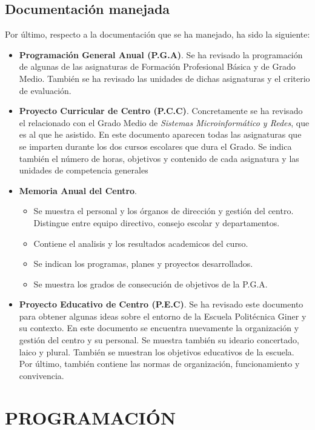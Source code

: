 \documentclass[spanish,12pt, a4paper,twoside]{paper}
\let\oldsection\section
\def\section{\cleardoublepage\oldsection}
\begin{document}
\subsection{Documentación manejada}
Por último, respecto a la documentación que se ha manejado, ha sido la siguiente:
\begin{itemize}
\item \textbf{Programación General Anual (P.G.A)}. Se ha revisado la programación de algunas de las asignaturas de Formación Profesional Básica y de Grado Medio. También se ha revisado las unidades de dichas asignaturas y el criterio de evaluación.
\item \textbf{Proyecto Curricular de Centro (P.C.C)}. Concretamente se ha revisado el relacionado con el Grado Medio de \textit{Sistemas Microinformático y Redes}, que es al que he asistido. En este documento aparecen todas las asignaturas que se imparten durante los dos cursos escolares que dura el Grado. Se indica también el número de horas, objetivos y contenido de cada asignatura y las unidades de competencia generales
\item \textbf{Memoria Anual del Centro}. 
\begin{itemize}
\item Se muestra el personal y los órganos de dirección y gestión del centro. Distingue entre equipo directivo, consejo escolar y departamentos.
\item Contiene el analisis y los resultados academicos del curso.
\item Se indican los programas, planes y proyectos desarrollados.
\item Se muestra los grados de consecución de objetivos de la P.G.A.
\end{itemize}
\item \textbf{Proyecto Educativo de Centro (P.E.C)}. Se ha revisado este documento para obtener algunas ideas sobre el entorno de la Escuela Politécnica Giner y su contexto. En este documento se encuentra nuevamente la organización y gestión del centro y su personal. Se muestra también su ideario concertado, laico y plural. También se muestran los objetivos educativos de la escuela. Por último, también contiene las normas de organización, funcionamiento y convivencia.
\end{itemize}

\section{PROGRAMACIÓN} %
\end{document}
